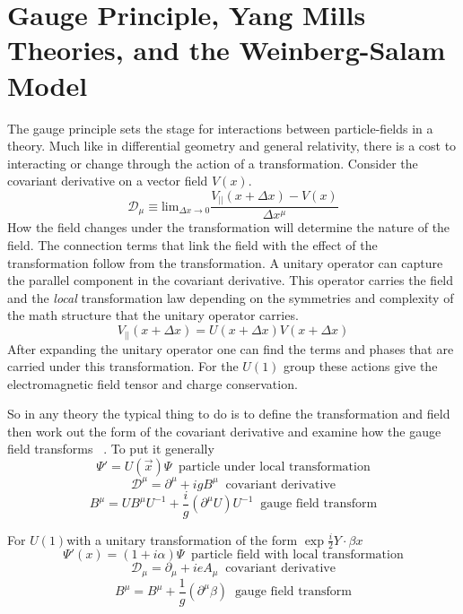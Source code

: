 \section{Gauge Principle, Yang Mills Theories, and the Weinberg-Salam Model}
The gauge principle sets the stage for interactions between particle-fields in a theory. Much like in differential geometry and general relativity, there is a cost to interacting or change through the action of a transformation. Consider the covariant derivative on a vector field $V(x)$.
\[\mathcal{D}_\mu \equiv \text{lim}_{\Delta x \rightarrow 0 } \frac{V_{||}(x+\Delta x) - V(x)}{\Delta x^{\mu}} \] 
How the field changes under the transformation will determine the nature of the field. The connection terms that link the field with the effect of the transformation follow from the transformation. A unitary operator can capture the parallel component in the covariant derivative. This operator carries the field and the \textit{local} transformation law depending on the symmetries and complexity of the math structure that the unitary operator carries. 
\[V_{||}(x+\Delta x) = U(x+\Delta x)V(x+\Delta x)\]
After expanding the unitary operator one can find the terms and phases that are carried under this transformation. 
For the $U(1)$ group these actions give the electromagnetic field tensor and charge conservation. 

So in any theory the typical thing to do is to define the transformation and field then work out the form of the covariant derivative and examine how the gauge field transforms ~\cite{Tully:1417476}. To put it generally
\begin{equation}
\label{eq:lt}
\Psi'= U(\overrightarrow{x})\Psi \;\;\text{particle under local transformation}\end{equation}
\begin{equation}
\label{eq:cd}
\mathcal{D}^\mu = \partial^\mu + igB^\mu \;\;\text{covariant derivative}
\end{equation}
\begin{equation}
\label{eq:gt}
B^\mu = UB^\mu U^{-1} + \frac{i}{g}(\partial^\mu U)U^{-1} \;\;\text{gauge field transform} 
\end{equation} 

For $U(1) $with a unitary transformation of the form $\exp{\frac{i}{2}Y\cdot\beta{x}}$ 
\[\Psi'(x)= (1+i\alpha)\Psi \;\;\text{particle field with local transformation}\]
\[\mathcal{D}_\mu = \partial_\mu + ieA_\mu \;\;\text{covariant derivative}\]
\[B^\mu = B^\mu + \frac{1}{g}(\partial^\mu \beta) \;\;\text{gauge field transform} \] 


